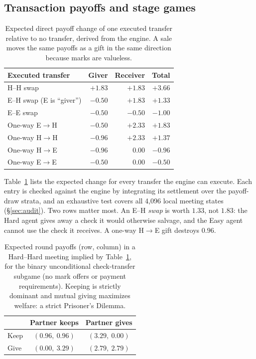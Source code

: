 \documentclass[sigconf,anonymous]{aamas}
\begin{document}
\subsection{Transaction payoffs and stage games}
\label{sec:payoffs}

\begin{table}[t]
\caption{Expected direct payoff change of one executed transfer relative to no
transfer, derived from the engine.  A sale moves the same payoffs as a gift in
the same direction because marks are valueless.}
\label{tab:payoffs}
\small
\centering
\begin{tabular}{@{}lrrr@{}}
\toprule
Executed transfer & Giver & Receiver & Total \\
\midrule
H--H swap & $+1.83$ & $+1.83$ & $+3.66$ \\
E--H swap (E is ``giver'') & $-0.50$ & $+1.83$ & $+1.33$ \\
E--E swap & $-0.50$ & $-0.50$ & $-1.00$ \\
One-way E$\rightarrow$H & $-0.50$ & $+2.33$ & $+1.83$ \\
One-way H$\rightarrow$H & $-0.96$ & $+2.33$ & $+1.37$ \\
One-way H$\rightarrow$E & $-0.96$ & $0.00$ & $-0.96$ \\
One-way E$\rightarrow$E & $-0.50$ & $0.00$ & $-0.50$ \\
\bottomrule
\end{tabular}
\end{table}

Table~\ref{tab:payoffs} lists the expected change for every transfer the engine
can execute.  Each entry is checked against the engine by integrating its
settlement over the payoff-draw strata, and an exhaustive test covers all 4,096
local meeting states (\S\ref{sec:audit}).  Two rows matter most.  An E--H
\emph{swap} is worth $1.33$, not $1.83$: the Hard agent gives away a check it
would otherwise salvage, and the Easy agent cannot use the check it receives.  A
one-way H$\rightarrow$E gift destroys $0.96$.

\begin{table}[t]
\caption{Expected round payoffs (row, column) in a Hard--Hard meeting implied by
Table~\ref{tab:payoffs}, for the binary unconditional check-transfer subgame (no
mark offers or payment requirements).  Keeping is strictly dominant and mutual
giving maximizes welfare: a strict Prisoner's Dilemma.}
\label{tab:pd}
\small
\centering
\begin{tabular}{@{}lcc@{}}
\toprule
& Partner keeps & Partner gives \\
\midrule
Keep & $(0.96,\ 0.96)$ & $(3.29,\ 0.00)$ \\
Give & $(0.00,\ 3.29)$ & $(2.79,\ 2.79)$ \\
\bottomrule
\end{tabular}
\end{table}
\end{document}
